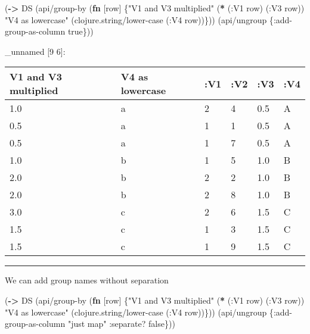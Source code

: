 \documentclass[]{article}
\newenvironment{Shaded}{\begin{snugshade}}{\end{snugshade}}
\newcommand{\AttributeTok}[1]{\textcolor[rgb]{0.77,0.63,0.00}{#1}}
\newcommand{\KeywordTok}[1]{\textcolor[rgb]{0.13,0.29,0.53}{\textbf{#1}}}
\newcommand{\NormalTok}[1]{#1}
\newcommand{\StringTok}[1]{\textcolor[rgb]{0.31,0.60,0.02}{#1}}
\newcommand{\VariableTok}[1]{\textcolor[rgb]{0.00,0.00,0.00}{#1}}
\begin{document}
\begin{Shaded}
\begin{Highlighting}[]
\NormalTok{(}\KeywordTok{->}\NormalTok{ DS}
\NormalTok{    (api/group-by (}\KeywordTok{fn}\NormalTok{ [row] \{}\StringTok{"V1 and V3 multiplied"}\NormalTok{ (}\KeywordTok{*}\NormalTok{ (}\AttributeTok{:V1}\NormalTok{ row)}
\NormalTok{                                                      (}\AttributeTok{:V3}\NormalTok{ row))}
                            \StringTok{"V4 as lowercase"}\NormalTok{ (clojure.string/lower-case (}\AttributeTok{:V4}\NormalTok{ row))\}))}
\NormalTok{    (api/ungroup \{}\AttributeTok{:add-group-as-column} \VariableTok{true}\NormalTok{\}))}
\end{Highlighting}
\end{Shaded}

\_unnamed {[}9 6{]}:

\begin{longtable}[]{@{}llllll@{}}
\toprule
V1 and V3 multiplied & V4 as lowercase & :V1 & :V2 & :V3 &
:V4\tabularnewline
\midrule
\endhead
1.0 & a & 2 & 4 & 0.5 & A\tabularnewline
0.5 & a & 1 & 1 & 0.5 & A\tabularnewline
0.5 & a & 1 & 7 & 0.5 & A\tabularnewline
1.0 & b & 1 & 5 & 1.0 & B\tabularnewline
2.0 & b & 2 & 2 & 1.0 & B\tabularnewline
2.0 & b & 2 & 8 & 1.0 & B\tabularnewline
3.0 & c & 2 & 6 & 1.5 & C\tabularnewline
1.5 & c & 1 & 3 & 1.5 & C\tabularnewline
1.5 & c & 1 & 9 & 1.5 & C\tabularnewline
\bottomrule
\end{longtable}

\begin{center}\rule{0.5\linewidth}{0.5pt}\end{center}

We can add group names without separation

\begin{Shaded}
\begin{Highlighting}[]
\NormalTok{(}\KeywordTok{->}\NormalTok{ DS}
\NormalTok{    (api/group-by (}\KeywordTok{fn}\NormalTok{ [row] \{}\StringTok{"V1 and V3 multiplied"}\NormalTok{ (}\KeywordTok{*}\NormalTok{ (}\AttributeTok{:V1}\NormalTok{ row)}
\NormalTok{                                                      (}\AttributeTok{:V3}\NormalTok{ row))}
                            \StringTok{"V4 as lowercase"}\NormalTok{ (clojure.string/lower-case (}\AttributeTok{:V4}\NormalTok{ row))\}))}
\NormalTok{    (api/ungroup \{}\AttributeTok{:add-group-as-column} \StringTok{"just map"}
                  \AttributeTok{:separate}\NormalTok{? }\VariableTok{false}\NormalTok{\}))}
\end{Highlighting}
\end{Shaded}
\end{document}
